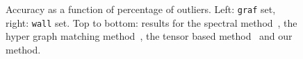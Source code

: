 \begin{figure}[!htp]
\begin{minipage}[b]{0.4\textwidth}
{            }%
        \end{minipage}%
        \addtocounter{subfigure}{-1}
        \caption{Accuracy as a function of percentage of outliers. Left: \texttt{graf} set, right: \texttt{wall} set. Top to bottom: results for the spectral method~\cite{Cour06}, the hyper graph matching method~\cite{Zass08}, the tensor based method~\cite{Duchenne_etal09} and our method.}
\label{fig:mini:subfig_affineerrorrate} %
\end{figure}%
%
\begin{figure}[!t]
\setlength{\abovecaptionskip}{0mm}
\setlength{\belowcaptionskip}{-2mm}
\centering
\setlength\subfigcapskip{-2mm}
\hspace{-8ex}
        \begin{minipage}[b]{0.4\textwidth}
        \end{minipage}%
        \hspace{10mm}%
        \addtocounter{subfigure}{-1}%
        \begin{minipage}[b]{0.4\textwidth}
\end{minipage}
\end{figure}
